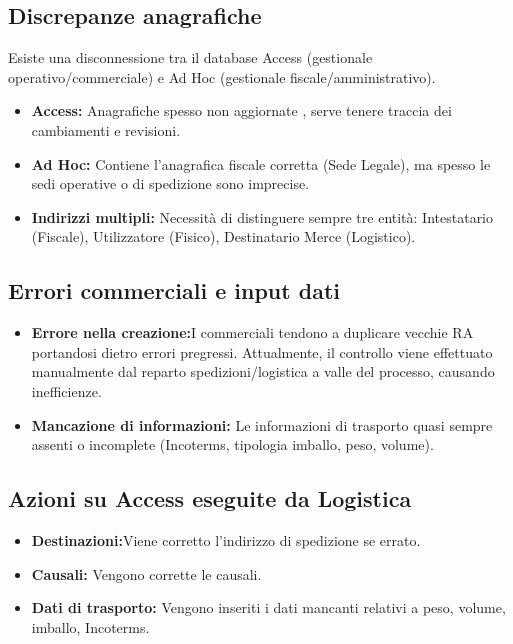 \documentclass[12pt, a4paper]{article} %
\begin{document}
\subsection{Discrepanze anagrafiche}
Esiste una disconnessione tra il database Access (gestionale
operativo/commerciale) e Ad Hoc (gestionale fiscale/amministrativo).
\begin{itemize}
    \item \textbf{Access:} Anagrafiche spesso non aggiornate , serve tenere traccia dei cambiamenti e revisioni.
    \item \textbf{Ad Hoc:} Contiene l'anagrafica fiscale corretta (Sede Legale), ma spesso le sedi operative o di spedizione sono imprecise.
    \item \textbf{Indirizzi multipli:} Necessità di distinguere sempre tre entità: Intestatario (Fiscale), Utilizzatore (Fisico), Destinatario Merce (Logistico).
\end{itemize}

\subsection{Errori commerciali e input dati}
\begin{itemize}
    \item  \textbf{Errore nella creazione:}I commerciali tendono a duplicare vecchie RA portandosi dietro errori pregressi. Attualmente, il controllo viene effettuato manualmente dal reparto spedizioni/logistica a valle del processo, causando inefficienze.
    \item \textbf{Mancazione di informazioni:} Le informazioni di trasporto quasi sempre assenti o incomplete (Incoterms, tipologia imballo, peso, volume).
\end{itemize}

\subsection{Azioni su Access eseguite da Logistica}
\begin{itemize}
    \item  \textbf{Destinazioni:}Viene corretto l'indirizzo di spedizione se errato.
    \item \textbf{Causali:} Vengono corrette le causali.
    \item \textbf{Dati di trasporto:} Vengono inseriti i dati mancanti relativi a peso, volume, imballo, Incoterms.
\end{itemize}
\end{document}

